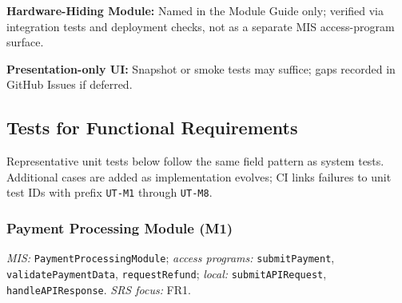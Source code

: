 \documentclass[12pt, titlepage]{article}
\begin{document}
\textbf{Hardware-Hiding Module:} Named in the Module Guide only; verified via integration tests and deployment checks, not as a separate MIS access-program surface.

\textbf{Presentation-only UI:} Snapshot or smoke tests may suffice; gaps recorded in GitHub Issues if deferred.

\subsection{Tests for Functional Requirements}

Representative unit tests below follow the same field pattern as system tests. Additional cases are added as implementation evolves; CI links failures to unit test IDs with prefix \texttt{UT-M1} through \texttt{UT-M8}.

\subsubsection{Payment Processing Module (M1)}

\textit{MIS:} \texttt{PaymentProcessingModule}; \textit{access programs:} \texttt{submitPayment}, \texttt{validatePaymentData}, \texttt{requestRefund}; \textit{local:} \texttt{submitAPIRequest}, \texttt{handleAPIResponse}. \textit{SRS focus:} FR1.
\end{document}
